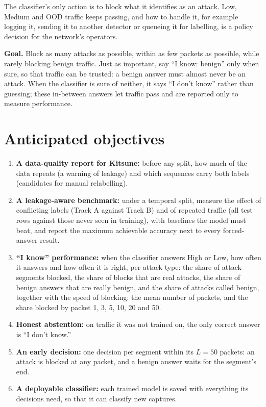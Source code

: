 \documentclass[11pt]{article}
\begin{document}
The classifier's only action is to block what it identifies as an attack. Low, Medium and OOD traffic keeps passing, and how to handle it, for example logging it, sending it to another detector or queueing it for labelling, is a policy decision for the network's operators.

\textbf{Goal.} Block as many attacks as possible, within as few packets as possible, while rarely blocking benign traffic. Just as important, say ``I know: benign'' only when sure, so that traffic can be trusted: a benign answer must almost never be an attack. When the classifier is sure of neither, it says ``I don't know'' rather than guessing; these in-between answers let traffic pass and are reported only to measure performance.

\section{Anticipated objectives}

\begin{enumerate}
  \item \textbf{A data-quality report for Kitsune:} before any split, how much of the data repeats (a warning of leakage) and which sequences carry both labels (candidates for manual relabelling).
  \item \textbf{A leakage-aware benchmark:} under a temporal split, measure the effect of conflicting labels (Track A against Track B) and of repeated traffic (all test rows against those never seen in training), with baselines the model must beat, and report the maximum achievable accuracy next to every forced-answer result.
  \item \textbf{``I know'' performance:} when the classifier answers High or Low, how often it answers and how often it is right, per attack type: the share of attack segments blocked, the share of blocks that are real attacks, the share of benign answers that are really benign, and the share of attacks called benign, together with the speed of blocking: the mean number of packets, and the share blocked by packet 1, 3, 5, 10, 20 and 50.
  \item \textbf{Honest abstention:} on traffic it was not trained on, the only correct answer is ``I don't know.''
  \item \textbf{An early decision:} one decision per segment within its $L = 50$ packets: an attack is blocked at any packet, and a benign answer waits for the segment's end.
  \item \textbf{A deployable classifier:} each trained model is saved with everything its decisions need, so that it can classify new captures.
\end{enumerate}
\end{document}
